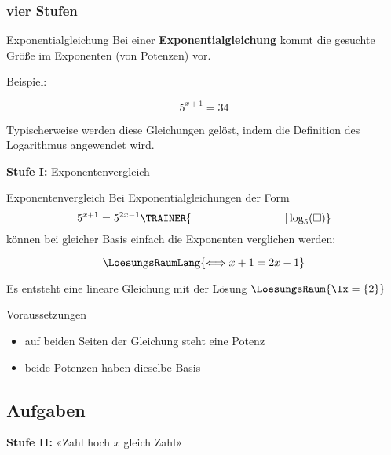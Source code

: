 \subsubsection{vier Stufen}
\begin{definition}{Exponentialgleichung}{}
  Bei einer \textbf{Exponentialgleichung} kommt die gesuchte Größe im
  Exponenten (von Potenzen) vor.
\end{definition}

Beispiel:

$$5^{x+1} = 34$$

Typischerweise werden diese Gleichungen gelöst, indem die Definition
des Logarithmus angewendet wird.


\vspace{4mm}
\textbf{Stufe I:} Exponentenvergleich\\

\begin{rezept}{Exponentenvergleich}{}
Bei Exponentialgleichungen der Form $$5^{x+1} =
5^{2x-1}\TRAINER{\hspace{30mm}| \log_5(\Box{})}$$ können bei
gleicher Basis einfach die Exponenten verglichen werden:

$$\LoesungsRaumLang{\Longleftrightarrow x+1=2x-1}$$


Es entsteht eine lineare Gleichung mit der Lösung $\LoesungsRaum{\lx = \{2\}}$
\end{rezept}

\begin{bemerkung}{Voraussetzungen}{}
  \begin{itemize}
  \item auf beiden Seiten der Gleichung steht eine Potenz
  \item beide Potenzen haben dieselbe Basis
    \end{itemize}
\end{bemerkung}
\newpage


\subsection*{Aufgaben}

\newpage
\textbf{Stufe II:} «Zahl hoch $x$ gleich Zahl»


